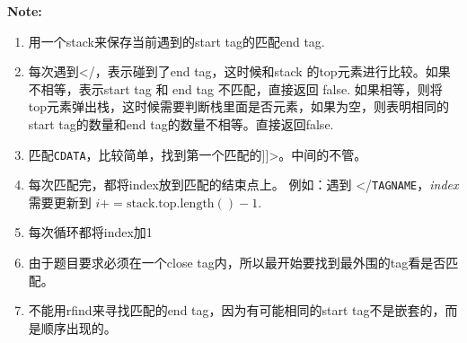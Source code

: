 \documentclass[a4paper,12pt]{article}
\begin{document}
	\par
	\vspace{0.5em}
	\noindent
	\textbf{\large{Note:}}
	\par
	\vspace{0.5em}
	\noindent
	\begin{CJK*}{UTF8}{gbsn}
		\begin{enumerate}
			\item 用一个stack来保存当前遇到的start tag的匹配end tag.
			\item 每次遇到\textless/，表示碰到了end tag，这时候和stack 的top元素进行比较。如果不相等，表示start tag 和 end tag 不匹配，直接返回 false. 如果相等，则将top元素弹出栈，这时候需要判断栈里面是否元素，如果为空，则表明相同的start tag的数量和end tag的数量不相等。直接返回false.
			\item 匹配\texttt{CDATA}，比较简单，找到第一个匹配的]]\textgreater。中间的不管。
			\item 每次匹配完，都将index放到匹配的结束点上。 例如：遇到 \textless/\texttt{TAG\textunderscore NAME}，\textit{index}需要更新到 $i += \text{stack}.\text{top}.\text{length}() - 1$. 
			\item 每次循环都将index加1
			\item 由于题目要求必须在一个close tag内，所以最开始要找到最外围的tag看是否匹配。
			\item 不能用rfind来寻找匹配的end tag，因为有可能相同的start tag不是嵌套的，而是顺序出现的。
		\end{enumerate}
		\clearpage\end{CJK*}
	
\end{document}

